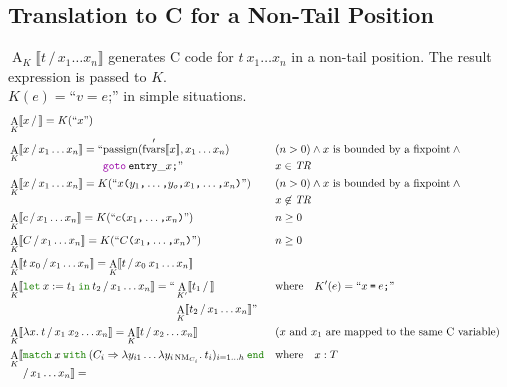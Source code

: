 \documentclass[a4paper,fleqn]{article}
\newcommand{\kwlet}{\mbox{\color{mygreen}\ttfamily let}}
\newcommand{\kwin}{\mbox{\color{mygreen}\ttfamily in}}
\newcommand{\kwmatch}{\mbox{\color{mygreen}\ttfamily match}}
\newcommand{\kwwith}{\mbox{\color{mygreen}\ttfamily with}}
\newcommand{\kwend}{\mbox{\color{mygreen}\ttfamily end}}
\newcommand{\lam}[2]{\lambda #1.\:#2}
\newcommand{\lamB}[1]{\lambda #1.\:}
\newcommand{\letin}[3]{\kwlet\:#1:=#2\:\kwin\:#3}
\newcommand{\match}[4]{\kwmatch\:#1\:\kwwith\:(#2 \Rightarrow #3)_{#4}\:\kwend}
\DeclareMathOperator{\NM}{NM}
\newcommand{\BRA}[1]{\llbracket #1 \rrbracket}
\newcommand{\tr}{\mathit{TR}}
\newcommand{\ldq}{\text{``}}
\newcommand{\rdq}{\text{''}}
\newcommand{\dq}[1]{\text{``}#1\text{''}}
\newcommand{\ttparen}[1]{\texttt{(}#1\texttt{)}}
\newcommand{\tteq}{\texttt{=}}
\newcommand{\ttsemi}{\texttt{;}}
\newcommand{\ttcomma}{\texttt{,}}
\newcommand{\kwgoto}{\mbox{\color{myviolet}\ttfamily goto}}
\DeclareMathOperator{\passign}{passign}
\DeclareMathOperator{\fvarsop}{fvars}
\newcommand{\fvarsd}[1]{\fvarsop'\BRA{#1}}
\DeclareMathOperator{\Aop}{A}
\newcommand{\A}[3]{\Aop_{#1}\BRA{#2\,/\,#3}}
\newcommand{\AbreakEq}[3]{\Aop_{#1}\llbracket \begin{aligned}[t] & #2 \\ & /\, #3 \rrbracket = \end{aligned}}
\begin{document}
\subsection{Translation to C for a Non-Tail Position}\label{sec:AK}
\raggedright
$\A{K}{t}{x_1\ldots x_n}$ generates C code for $t\:x_1\ldots x_n$ in a non-tail position.
The result expression is passed to $K$. \\
$K(e) = \dq{v = e\ttsemi}$ in simple situations.
\begin{align*}
  &\A{K}{x}{} = K(\dq{x}) \\
  &\A{K}{x}{x_1\ldots x_n} =
      \begin{aligned}[t] \ldq & {\passign(\fvarsd{x}, x_1 \ldots x_n)} \\ & \kwgoto\:\mathtt{entry\_}x\ttsemi \rdq \end{aligned}
    && \begin{aligned}[t] & (n > 0) \wedge \text{$x$ is bounded by a fixpoint} \wedge {} \\ & x \in \tr \end{aligned} \\
  &\A{K}{x}{x_1\ldots x_n} = K(\dq{x\ttparen{y_1\ttcomma\dotsc\ttcomma y_o\ttcomma x_1\ttcomma\dotsc\ttcomma  x_n}})
    && \begin{aligned}[t] & (n > 0) \wedge \text{$x$ is bounded by a fixpoint} \wedge {} \\ & x \not\in \tr \end{aligned} \\
  &\A{K}{c}{x_1\ldots x_n} = K(\dq{c\ttparen{x_1\ttcomma\dotsc\ttcomma x_n}})                                   && n \geq 0 \\
  &\A{K}{C}{x_1\ldots x_n} = K(\dq{C\ttparen{x_1\ttcomma\dotsc\ttcomma x_n}})                                   && n \geq 0 \\
  &\A{K}{t\:x_0}{x_1\ldots x_n} = \A{K}{t}{x_0\:x_1\ldots x_n} \\
  &\A{K}{\letin{x}{t_1}{t_2}}{x_1\ldots x_n} =
      \begin{aligned}[t] \ldq & \A{K'}{t_1}{} \\ & \A{K}{t_2}{x_1\ldots x_n} \rdq \end{aligned}
    && \text{where}\quad K'(e) = \dq{x\:\tteq\:e\ttsemi} \\
  &\A{K}{\lam{x}{t}}{x_1\:x_2\ldots x_n} = \A{K}{t}{x_2\ldots x_n}                                  && \text{($x$ and $x_1$ are mapped to the same C variable)} \\
  &\AbreakEq{K}{\match{x}{C_i}{\lambda y_{i1}\ldots\lamB{y_{i\NM_{C_i}}}t_i}{i=1\ldots h}}{x_1\ldots x_n} && \text{where}\quad x : T \\

\end{align*}
\end{document}

